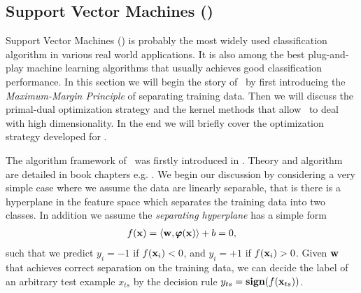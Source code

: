 {\iffalse
The key is to introduce a set of tighter upper bounds on (\ref{lr_posteriori_log}) that are parameterized by $\valpha$.
The bounds should have a simple form such that the maximizing (\ref{lr_posteriori_log}) over $\vw$ can be solved analytically with $\alpha$.
The solution to the original problem is transferred as finding the tighter upper bounds for  $\vw$, which is to minimize with respect to $\alpha$.
\iffalse
The dual form is given by 
\begin{align*}
	\underset{\valpha}{\minimize} & \quad\frac{1}{2}\sum_{i=1}^{m}\sum_{j=1}^{m}\valpha_iy_ix_ix_jy_j\valpha_j + \sum_{i=1}^{m}\left[\valpha_i\log\alpha_i+(\sigma^2-\valpha_i)\log(\sigma^2-\valpha_i)\right] \\
	\st &\quad 0\le\alpha\le\sigma^2, \, \forall i=\{1,\cdots,m\}.
\end{align*}
\fi
Later on, optimization algorithms that are based on dual form have been developed, for example iterative optimization method \citep{Keerthi05a} and the dual coordinate descent method \citep{Yu11dual}.
\fi


%
% 
\subsection{Support Vector Machines (\svm)}	\label{sc_svm}

Support Vector Machines (\svm) is probably the most widely used classification algorithm in various real world applications.
It is also among the best plug-and-play machine learning algorithms that usually achieves good classification performance.
In this section we will begin the story of \svm\ by first introducing the \textit{Maximum-Margin Principle} of separating training data.
Then we will discuss the primal-dual optimization strategy and the kernel methods that allow \svm\ to deal with high dimensionality.
In the end we will briefly cover the optimization strategy developed for \svm.

The algorithm framework of \svm\ was firstly introduced in \citep{Boser92,Cortes95support}.
Theory and algorithm are detailed in book chapters e.g. \citep{Scholkopf02learning,taylor04,Bishop07}.
We begin our discussion by considering a very simple case where we assume the data are linearly separable, that is there is a hyperplane in the feature space which separates the training data into two classes.
In addition we assume the \textit{separating hyperplane} has a simple form
\begin{align*}
	f(\mathbf {x})=\langle \mathbf {w}, \pmb \varphi(\mathbf {x}) \rangle + b = 0,
\end{align*}
such that we predict $y_i=-1$ if $f(\mathbf {x}_i)<0$, and $y_i=+1$ if $f(\mathbf {x}_i)>0$.
Given $\vw$ that achieves correct separation on the training data, we can decide the label of an arbitrary test example $x_{ts}$ by the decision rule $y_{ts}=\textbf{sign}(f(\mathbf {x}_{ts}))$.

}
